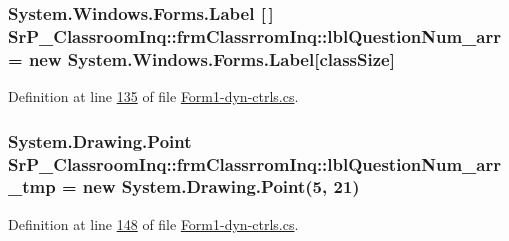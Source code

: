 \hypertarget{class_sr_p___classroom_inq_1_1frm_classrrom_inq_ae46e928c386c686caa96bfe4f302c2f1}{
\subsubsection[{lbl\-Question\-Num\-\_\-arr}]{\setlength{\rightskip}{0pt plus 5cm}\-System.\-Windows.\-Forms.\-Label \mbox{[}$\,$\mbox{]} {\bf \-Sr\-P\-\_\-\-Classroom\-Inq\-::frm\-Classrrom\-Inq\-::lbl\-Question\-Num\-\_\-arr} = new \-System.\-Windows.\-Forms.\-Label\mbox{[}{\bf class\-Size}\mbox{]}}}
\label{class_sr_p___classroom_inq_1_1frm_classrrom_inq_ae46e928c386c686caa96bfe4f302c2f1}


\-Definition at line \hyperlink{_form1-dyn-ctrls_8cs_source_l00135}{135} of file \hyperlink{_form1-dyn-ctrls_8cs_source}{\-Form1-\/dyn-\/ctrls.\-cs}.

\hypertarget{class_sr_p___classroom_inq_1_1frm_classrrom_inq_a9af0d3cc5171be1c8b01ea1e208d61ee}{
\subsubsection[{lbl\-Question\-Num\-\_\-arr\-\_\-tmp}]{\setlength{\rightskip}{0pt plus 5cm}\-System.\-Drawing.\-Point {\bf \-Sr\-P\-\_\-\-Classroom\-Inq\-::frm\-Classrrom\-Inq\-::lbl\-Question\-Num\-\_\-arr\-\_\-tmp} = new \-System.\-Drawing.\-Point(5, 21)}}
\label{class_sr_p___classroom_inq_1_1frm_classrrom_inq_a9af0d3cc5171be1c8b01ea1e208d61ee}


\-Definition at line \hyperlink{_form1-dyn-ctrls_8cs_source_l00148}{148} of file \hyperlink{_form1-dyn-ctrls_8cs_source}{\-Form1-\/dyn-\/ctrls.\-cs}.

